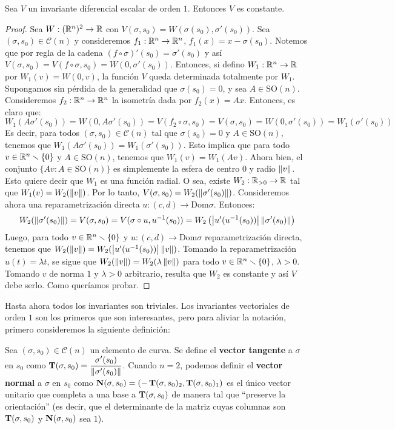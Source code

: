 \begin{prop}
Sea $V$ un invariante diferencial escalar de orden $1$. Entonces $V$ es constante.
\begin{proof}
Sea $W:(\mathbb{R}^n)^2\to\mathbb{R}$ con $V(\sigma,s_0)=W(\sigma(s_0),\sigma'(s_0))$. Sea $(\sigma,s_0)\in\mathscr{C}(n)$ y consideremos $f_1:\mathbb{R}^n\to\mathbb{R}^n$, $f_1(x)=x-\sigma(s_0)$. Notemos que por regla de la cadena $(f\circ\sigma)'(s_0) = \sigma'(s_0)$ y así $V(\sigma,s_0)=V(f\circ\sigma,s_0)=W(0,\sigma'(s_0))$. Entonces, si defino $W_1:\mathbb{R}^n\to\mathbb{R}$ por $W_1(v)=W(0,v)$, la función $V$ queda determinada totalmente por $W_1$.
Supongamos sin pérdida de la generalidad que $\sigma(s_0)=0$, y sea $A\in\mathrm{SO}(n)$. Consideremos $f_2:\mathbb{R}^n\to\mathbb{R}^n$ la isometría dada por $f_2(x)=Ax$. Entonces, es claro que: $$W_1(A\sigma'(s_0)) = W(0,A\sigma'(s_0)) = V(f_2\circ\sigma,s_0) = V(\sigma,s_0)=W(0,\sigma'(s_0))=W_1(\sigma'(s_0))$$
Es decir, para todos $(\sigma,s_0)\in\mathscr{C}(n)$ tal que $\sigma(s_0)=0$ y $A\in\mathrm{SO}(n)$, tenemos que $W_1(A\sigma'(s_0))=W_1(\sigma'(s_0))$. Esto implica que para todo $v\in\mathbb{R}^n\smallsetminus\{0\}$ y $A\in\mathrm{SO}(n)$, tenemos que $W_1(v)=W_1(Av)$. Ahora bien, el conjunto $\{Av:A\in\mathrm{SO}(n)\}$ es simplemente la esfera de centro $0$ y radio $\left\| v \right\|$. Esto quiere decir que $W_1$ es una función radial. O sea, existe $W_2:\mathbb{R}_{>0}\to\mathbb{R}$ tal que $W_1(v)=W_2(\left\| v \right\|)$. Por lo tanto, $V(\sigma,s_0)=W_2(\left\| \sigma'(s_0) \right\|)$. Consideremos ahora una reparametrización directa $u:(c,d)\to\mathrm{Dom}\sigma$. Entonces: $$W_2(\left\| \sigma'(s_0) \right\|) = V(\sigma,s_0)=V(\sigma\circ u,u^{-1}(s_0)) = W_2\left(\left\lvert u'(u^{-1}(s_0)) \right\rvert\left\| \sigma'(s_0) \right\|\right)$$ Luego, para todo $v\in\mathbb{R}^n\smallsetminus\{0\}$ y $u:(c,d)\to\mathrm{Dom}\sigma$ reparametrización directa, tenemos que $W_2(\left\| v \right\|)=W_2(\left\lvert u'(u^{-1}(s_0)) \right\rvert\left\| v \right\|)$. Tomando la reparametrización $u(t)=\lambda t$, se sigue que $W_2(\left\| v \right\|)=W_2(\lambda\left\| v \right\|)$ para todo $v\in\mathbb{R}^n\smallsetminus\{0\}$, $\lambda>0$. Tomando $v$ de norma $1$ y $\lambda>0$ arbitrario, resulta que $W_2$ es constante y así $V$ debe serlo. Como queríamos probar.
\end{proof}
\end{prop}

Hasta ahora todos los invariantes son triviales. Los invariantes vectoriales de orden $1$ son los primeros que son interesantes, pero para aliviar la notación, primero consideremos la siguiente definición:

\begin{defn}
Sea $(\sigma,s_0)\in\mathscr{C}(n)$ un elemento de curva. Se define el \textbf{vector tangente} a $\sigma$ en $s_0$ como $\operatorname{\mathbf{T}}(\sigma,s_0)=\dfrac{\sigma'(s_0)}{\left\| \sigma'(s_0) \right\|}$. Cuando $n=2$, podemos definir el \textbf{vector normal} a $\sigma$ en $s_0$ como $\operatorname{\mathbf{N}}(\sigma,s_0) = (-\operatorname{\mathbf{T}}(\sigma,s_0)_2, \operatorname{\mathbf{T}}(\sigma,s_0)_1)$ es el único vector unitario que completa a una base a $\operatorname{\mathbf{T}}(\sigma,s_0)$ de manera tal que "`preserve la orientación"' (es decir, que el determinante de la matriz cuyas columnas son $\operatorname{\mathbf{T}}(\sigma,s_0)$ y $\operatorname{\mathbf{N}}(\sigma,s_0)$ sea $1$).
\end{defn}

